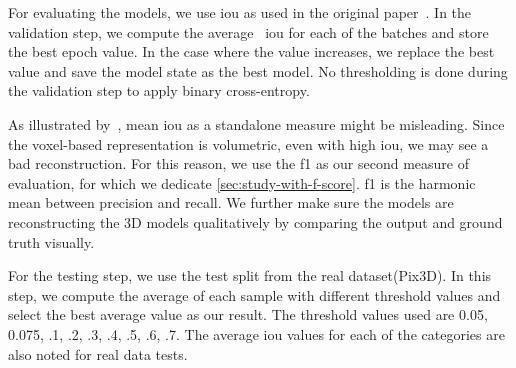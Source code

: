 For evaluating the models, we use \gls{iou} as used in the original paper~\cite{Xie_2019}.
In the validation step, we compute the average ~\gls{iou} for each of the batches and store the best epoch value.
In the case where the value increases, we replace the best value and save the model state as the best model.
No thresholding is done during the validation step to apply binary cross-entropy.

As illustrated by~\cite{Tatarchenko2019}, mean \gls{iou} as a standalone measure might be misleading.
Since the voxel-based representation is volumetric, even with high \gls{iou}, we may see a bad reconstruction.
For this reason, we use the \gls{f1} as our second measure of evaluation, for which we dedicate \autoref{sec:study-with-f-score}.
\gls{f1} is the harmonic mean between precision and recall.
We further make sure the models are reconstructing the 3D models qualitatively by comparing the output and ground truth visually.

For the testing step, we use the test split from the real dataset(Pix3D).
In this step, we compute the average of each sample with different threshold values and select the best average value as our result.
The threshold values used are 0.05, 0.075, .1, .2, .3, .4, .5, .6, .7.
The average \gls{iou} values for each of the categories are also noted for real data tests.





